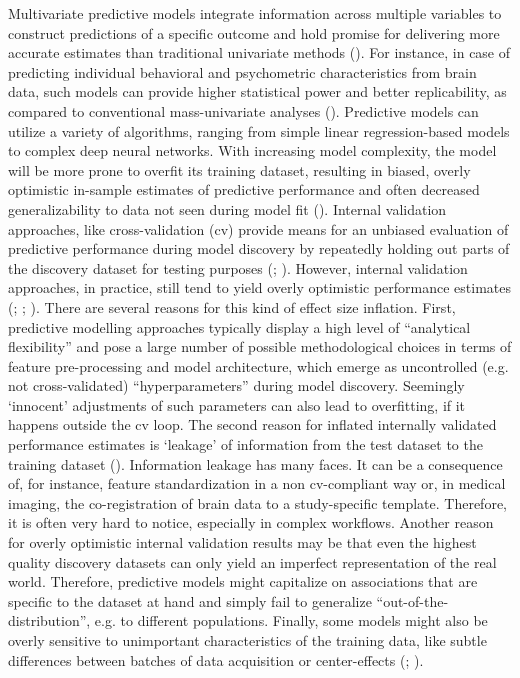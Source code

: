\documentclass{article}
\begin{document}
Multivariate predictive models integrate information across multiple variables to construct predictions of a specific outcome and hold promise for delivering more accurate estimates than traditional univariate methods (\cite{Woo_2017}). For instance, in case of predicting individual behavioral and psychometric characteristics from brain data, such models can provide higher statistical power and better replicability, as compared to conventional mass-univariate analyses (\cite{Spisak_2023}). Predictive models can utilize a variety of algorithms, ranging from simple linear regression-based models to complex deep neural networks. With increasing model complexity, the model will be more prone to overfit its training dataset, resulting in biased, overly optimistic in-sample estimates of predictive performance and often decreased generalizability to data not seen during model fit (\cite{Hosseini_2020}). Internal validation approaches, like cross-validation (\acrshort{cv}) provide means for an unbiased evaluation of predictive performance during model discovery by repeatedly holding out parts of the discovery dataset for testing purposes (\cite{Efron_1994}; \cite{Poldrack_2020}).
However, internal validation approaches, in practice, still tend to yield overly optimistic performance estimates (\cite{Efron_1983}; \cite{Sui_2020}; \cite{Varoquaux_2022}). There are several reasons for this kind of effect size inflation. First, predictive modelling approaches typically display a high level of ``analytical flexibility'' and pose a large number of possible methodological choices in terms of feature pre-processing and model architecture, which emerge as uncontrolled (e.g. not cross-validated) ``hyperparameters'' during model discovery. Seemingly `innocent' adjustments of such parameters can also lead to overfitting, if it happens outside the \acrshort{cv} loop. The second reason for inflated internally validated performance estimates is `leakage' of information from the test dataset to the training dataset (\cite{Kapoor_2023}). Information leakage has many faces. It can be a consequence of, for instance, feature standardization in a non \acrshort{cv}-compliant way or, in medical imaging, the co-registration of brain data to a study-specific template. Therefore, it is often very hard to notice, especially in complex workflows.
Another reason for overly optimistic internal validation results may be that even the highest quality discovery datasets can only yield an imperfect representation of the real world. Therefore, predictive models might capitalize on associations that are specific to the dataset at hand and simply fail to generalize ``out-of-the-distribution'', e.g. to different populations. Finally, some models might also be overly sensitive to unimportant characteristics of the training data, like subtle differences between batches of data acquisition or center-effects (\cite{Prosperi_2020}; \cite{Spisak_2022}).
\end{document}
